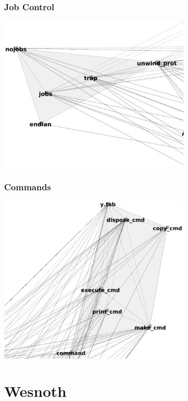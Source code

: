 \documentclass{../../slides-style}
\begin{document}
    \begin{frame}
        \frametitle{Job Control}
        \begin{center}
            \includegraphics[width=0.7\textwidth]{bashJobControl.png}
        \end{center}
    \end{frame}

    \begin{frame}
        \frametitle{Commands}
        \begin{center}
            \includegraphics[width=0.7\textwidth]{bashCommands.png}
        \end{center}
    \end{frame}

    \section{Wesnoth}
\end{document}
